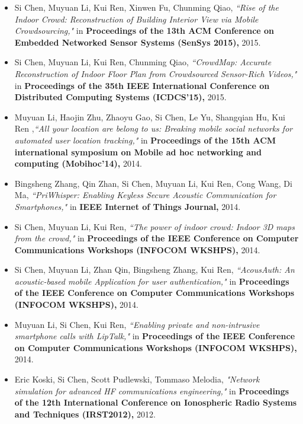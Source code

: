 \documentclass[a4paper, 11pt]{article}
\makeatletter
\newcommand{\ressection}[1]
{\fcolorbox{black}{shadecolor}{\vbox{\hsize 0.98\textwidth \textbf{\mbox{~}{\@ \large #1} \vphantom{p\^{E}}}}}}
\makeatother
\begin{document}
\ressection{Publications}
\begin{itemize}
\item 
Si Chen, Muyuan Li, Kui Ren, Xinwen Fu, Chunming Qiao, \emph{``Rise of the Indoor Crowd: Reconstruction of Building Interior View via Mobile Crowdsourcing,"} in \textbf{Proceedings of the 13th ACM Conference on Embedded Networked Sensor Systems (SenSys 2015),} 2015.
\item 
Si Chen, Muyuan Li, Kui Ren, Chunming Qiao, \emph{``CrowdMap: Accurate Reconstruction of Indoor Floor Plan from Crowdsourced Sensor-Rich Videos,"} in \textbf{Proceedings of the 35th IEEE International Conference on Distributed Computing Systems (ICDCS'15),} 2015.
\item 
Muyuan Li, Haojin Zhu, Zhaoyu Gao, Si Chen, Le Yu, Shangqian Hu, Kui Ren ,\emph{``All your location are belong to us: Breaking mobile social networks for automated user location tracking,"} in \textbf{Proceedings of the 15th ACM international symposium on Mobile ad hoc networking and computing (Mobihoc'14),} 2014.
\item 
Bingsheng Zhang, Qin Zhan, Si Chen, Muyuan Li, Kui Ren, Cong Wang, Di Ma, \emph{``PriWhisper: Enabling Keyless Secure Acoustic Communication for Smartphones,"} in \textbf{IEEE Internet of Things Journal,} 2014.
\item 
Si Chen, Muyuan Li, Kui Ren, \emph{``The power of indoor crowd: Indoor 3D maps from the crowd,"} in \textbf{Proceedings of the IEEE Conference on Computer Communications Workshops (INFOCOM WKSHPS),} 2014.
\item 
Si Chen, Muyuan Li, Zhan Qin, Bingsheng Zhang, Kui Ren, \emph{``AcousAuth: An acoustic-based mobile Application for user authentication,"} in \textbf{Proceedings of the IEEE Conference on Computer Communications Workshops (INFOCOM WKSHPS),} 2014.
\item 
Muyuan Li, Si Chen, Kui Ren, \emph{``Enabling private and non-intrusive smartphone calls with LipTalk,"} in \textbf{Proceedings of the IEEE Conference on Computer Communications Workshops (INFOCOM WKSHPS),}  2014.
\item 
Eric Koski, Si Chen, Scott Pudlewski, Tommaso Melodia, \emph{"Network simulation for advanced HF communications engineering,"} in \textbf{Proceedings of the 12th International Conference on Ionospheric Radio Systems and Techniques (IRST2012),} 2012.

\end{itemize}
\end{document}
